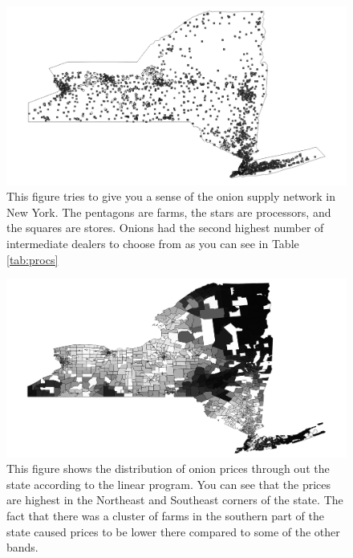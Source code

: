 \documentclass{report}
\begin{document}
\begin{figure}
\centering
\begin{framed}
\includegraphics[scale=.39]{network_49}
\caption{This figure tries to give you a sense of the onion supply network in New York. The pentagons are farms, the stars are processors, and the squares are stores. Onions had the second highest number of intermediate dealers to choose from as you can see in Table \ref{tab:procs}}
\label{fig:network_49}
\end{framed}
\end{figure}

\begin{figure}
\centering
\begin{framed}
\includegraphics[scale=.39]{prices_49}
\caption{This figure shows the distribution of onion prices through out the state according to the linear program. You can see that the prices are highest in the Northeast and Southeast corners of the state. The fact that there was a cluster of farms in the southern part of the state caused prices to be lower there compared to some of the other bands.}
\label{fig:prices_49}
\end{framed}
\end{figure}
\end{document}
